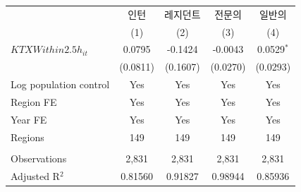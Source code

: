 \begingroup
\centering
\begin{tabular}{lcccc}
   \toprule
                          & 인턴     & 레지던트 & 전문의   & 일반의 \\   
                          & (1)      & (2)      & (3)      & (4)\\  
   \midrule 
   $KTXWithin2.5h_{it}$   & 0.0795   & -0.1424  & -0.0043  & 0.0529$^{*}$\\   
                          & (0.0811) & (0.1607) & (0.0270) & (0.0293)\\   
   Log population control & Yes      & Yes      & Yes      & Yes\\  
   Region FE              & Yes      & Yes      & Yes      & Yes\\  
   Year FE                & Yes      & Yes      & Yes      & Yes\\  
   Regions                & 149      & 149      & 149      & 149\\  
    \\
   Observations           & 2,831    & 2,831    & 2,831    & 2,831\\  
   Adjusted R$^2$         & 0.81560  & 0.91827  & 0.98944  & 0.85936\\  
   \bottomrule
\end{tabular}
\par\endgroup

